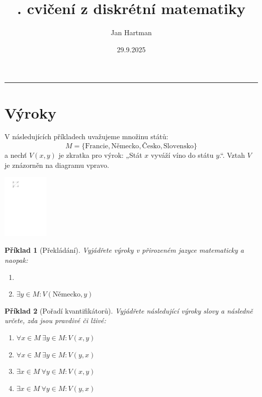 \documentclass[10pt]{article}
\title{\tutnum. cvičení z diskrétní matematiky}
\author{Jan Hartman}
\date{29.9.2025}
\newcommand{\titlerule}{%
    \noindent %
    \makebox[\textwidth]{\large \thetitle \hfill \thedate}
    \rule{\textwidth}{0.4pt}%
}
\theoremstyle{definitionstyle}
\theoremstyle{problemstyle}
\newtheorem{problem}{Příklad}
\begin{document}
\titlerule

\section{Výroky}



\begin{minipage}{0.7\textwidth}
V následujících příkladech uvažujeme množinu států: $$M = \{ \text{Francie}, \text{Německo}, \text{Česko}, \text{Slovensko} \}$$ a nechť $V(x,y)$ je zkratka pro výrok: „Stát $x$ vyváží víno do státu $y$.“. Vztah $V$ je znázorněn na diagramu vpravo.
\end{minipage}%
\hfill
\begin{minipage}{0.15\textwidth}
  \centering
  \includegraphics[width=2.2cm]{states.pdf}
\end{minipage}

\begin{problem}[Překládání]
Vyjádřete výroky v přirozeném jazyce matematicky a naopak:
\begin{enumerate}[label=(\alph*)]
    \item {}
    \item $\exists y \in M : V(\text{Německo},y)$
\end{enumerate}
\end{problem}

\begin{problem}[Pořadí kvantifikátorů]
Vyjádřete následující výroky slovy a následně určete, zda jsou pravdivé či lživé:
\begin{enumerate}[label=(\alph*)]
    \item $\forall x \in M \ \exists y \in M : V(x,y)$
    \item $\forall x \in M \ \exists y \in M : V(y,x)$
    \item $\exists x \in M \ \forall y \in M : V(x,y)$
    \item $\exists x \in M \ \forall y \in M : V(y,x)$
\end{enumerate}

\end{problem}
\end{document}
